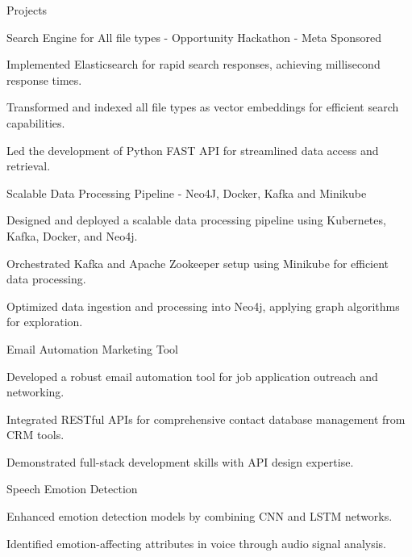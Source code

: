 \documentclass{resume} %
\begin{document}
    \begin{rSection}{Projects}
                    \begin{rSubsection}
                                    {Search Engine for All file types {-} Opportunity Hackathon {-} Meta Sponsored}
                                {}{}{}
                                    \item Implemented Elasticsearch for rapid search responses, achieving millisecond response times.
                                    \item Transformed and indexed all file types as vector embeddings for efficient search capabilities.
                                    \item Led the development of Python FAST API for streamlined data access and retrieval.
                            \end{rSubsection}
                    \begin{rSubsection}
                                    {Scalable Data Processing Pipeline {-} Neo4J, Docker, Kafka and Minikube}
                                {}{}{}
                                    \item Designed and deployed a scalable data processing pipeline using Kubernetes, Kafka, Docker, and Neo4j.
                                    \item Orchestrated Kafka and Apache Zookeeper setup using Minikube for efficient data processing.
                                    \item Optimized data ingestion and processing into Neo4j, applying graph algorithms for exploration.
                            \end{rSubsection}
                    \begin{rSubsection}
                                    {Email Automation Marketing Tool}
                                {}{}{}
                                    \item Developed a robust email automation tool for job application outreach and networking.
                                    \item Integrated RESTful APIs for comprehensive contact database management from CRM tools.
                                    \item Demonstrated full{-}stack development skills with API design expertise.
                            \end{rSubsection}
                    \begin{rSubsection}
                                    {Speech Emotion Detection}
                                {}{}{}
                                    \item Enhanced emotion detection models by combining CNN and LSTM networks.
                                    \item Identified emotion{-}affecting attributes in voice through audio signal analysis.
                            \end{rSubsection}
            \end{rSection}
\end{document}
